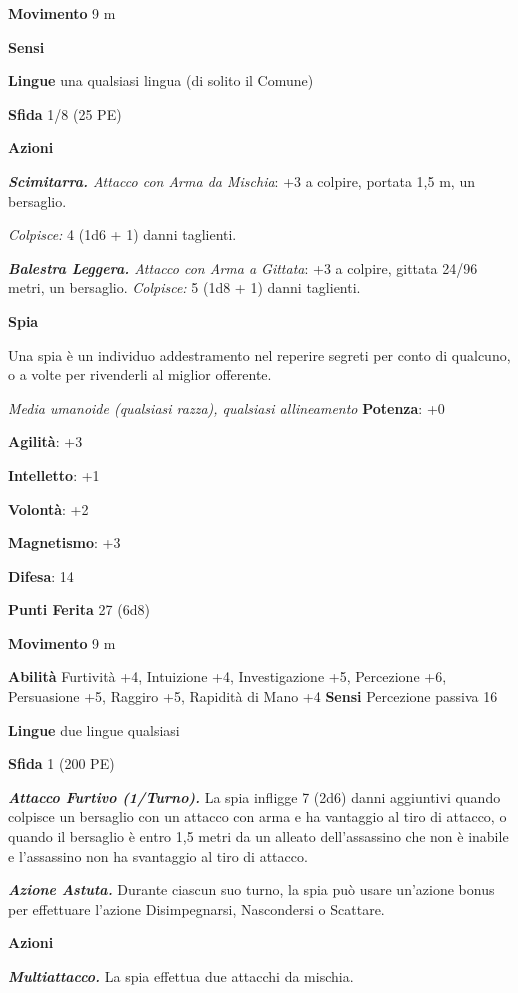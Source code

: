 \begin{multicols}{2}
\textbf{Movimento} 9 m

\textbf{Sensi} 

\textbf{Lingue} una qualsiasi lingua (di solito il Comune)

\textbf{Sfida} 1/8 (25 PE)

\textbf{Azioni}

\emph{\textbf{Scimitarra.} Attacco con Arma da Mischia}: +3 a colpire,
portata 1,5 m, un bersaglio.

\emph{Colpisce:} 4 (1d6 + 1) danni taglienti.

\emph{\textbf{Balestra Leggera.} Attacco con Arma a Gittata}: +3 a
colpire, gittata 24/96 metri, un bersaglio. \emph{Colpisce:} 5 (1d8 + 1)
danni taglienti.

\textbf{Spia}

Una spia è un individuo addestramento nel reperire segreti per conto di
qualcuno, o a volte per rivenderli al miglior offerente.

\emph{Media umanoide (qualsiasi razza), qualsiasi allineamento}
\textbf{Potenza}: +0

\textbf{Agilità}: +3

\textbf{Intelletto}: +1

\textbf{Volontà}: +2

\textbf{Magnetismo}: +3

\textbf{Difesa}: 14

\textbf{Punti Ferita} 27 (6d8)

\textbf{Movimento} 9 m

\textbf{Abilità} Furtività +4, Intuizione +4, Investigazione +5,
Percezione +6, Persuasione +5, Raggiro +5, Rapidità di Mano +4
\textbf{Sensi} Percezione passiva 16

\textbf{Lingue} due lingue qualsiasi

\textbf{Sfida} 1 (200 PE)

\emph{\textbf{Attacco Furtivo (1/Turno).}} La spia infligge 7 (2d6)
danni aggiuntivi quando colpisce un bersaglio con un attacco con arma e
ha vantaggio al tiro di attacco, o quando il bersaglio è entro 1,5 metri
da un alleato dell'assassino che non è inabile e l'assassino non ha
svantaggio al tiro di attacco.

\emph{\textbf{Azione Astuta.}} Durante ciascun suo turno, la spia può
usare un'azione bonus per effettuare l'azione Disimpegnarsi, Nascondersi
o Scattare.

\textbf{Azioni}

\emph{\textbf{Multiattacco.}} La spia effettua due attacchi da mischia.


\end{multicols}
